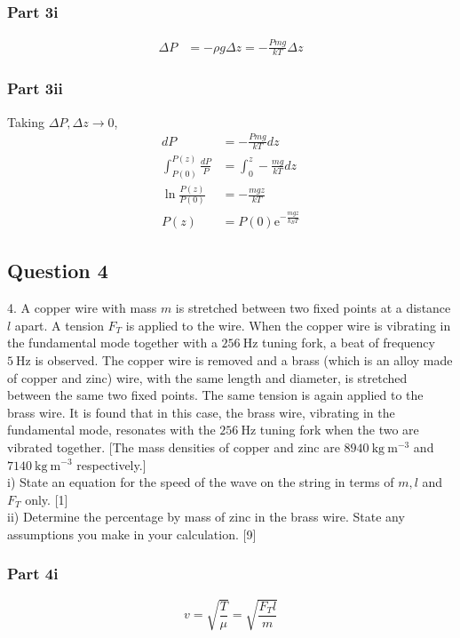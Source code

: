 \documentclass{article}
\begin{document}
\subsubsection{Part 3i}
\begin{align}
\Delta P &= -\rho g \Delta z = - \frac{Pmg}{kT} \Delta z
\end{align}

\subsubsection{Part 3ii}
Taking $\Delta P, \Delta z \rightarrow 0$,
\begin{align}
    dP &= - \frac{Pmg}{kT} dz \\
    \int_{P(0)}^{P(z)} \frac{dP}{P} &= \int_0^z -\frac{mg}{kT} dz \\
    \ln \frac{P(z)}{P(0)} &= -\frac{mgz}{kT} \\
    P(z) &= P(0) \mathrm{e}^{-\frac{m g z}{k_{B} T}}
\end{align}
\subsection{Question 4}
4. A copper wire with mass $m$ is stretched between two fixed points at a distance $l$ apart. A tension $F_{T}$ is applied to the wire. When the copper wire is vibrating in the fundamental mode together with a $256 \mathrm{~Hz}$ tuning fork, a beat of frequency $5 \mathrm{~Hz}$ is observed. The copper wire is removed and a brass (which is an alloy made of copper and zinc) wire, with the same length and diameter, is stretched between the same two fixed points. The same tension is again applied to the brass wire. It is found that in this case, the brass wire, vibrating in the fundamental mode, resonates with the $256 \mathrm{~Hz}$ tuning fork when the two are vibrated together. [The mass densities of copper and zinc are $8940 \mathrm{~kg} \mathrm{~m}^{-3}$ and $7140 \mathrm{~kg} \mathrm{~m}^{-3}$ respectively.] \\
i) State an equation for the speed of the wave on the string in terms of $m, l$ and $F_{T}$ only. [1] \\
ii) Determine the percentage by mass of zinc in the brass wire. State any assumptions you make in your calculation. [9] 

\subsubsection{Part 4i}
\[v=\sqrt{\frac{T}{\mu}} = \sqrt{\frac{F_T l}{m}}\]
\end{document}
